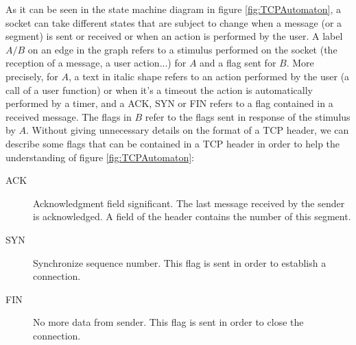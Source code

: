 \documentclass[a4paper, 10pt]{article}
\begin{document}
    As it can be seen in the state machine diagram in figure \ref{fig:TCPAutomaton},
    a socket can take different states that are
    subject to change when a message (or a segment) is sent or received or when an action
    is performed by the user. A label $A/B$ on an edge in the graph refers to a stimulus performed on the socket
    (the reception of a message, a user action...) for $A$ and a flag sent for $B$.
    More precisely, for $A$, a text in italic shape refers to an action performed by
    the user (a call of a user function) or when it's a timeout the action is automatically
    performed by a timer, and a ACK, SYN or FIN refers to a flag contained in a received message.
    The flags in $B$ refer to the flags sent in response of the stimulus by $A$.
    Without giving unnecessary details on the format of a TCP header, we can
    describe some flags that can be contained in a TCP header in order to help the understanding
    of figure \ref{fig:TCPAutomaton}:
    \begin{description}
        \item[ACK] Acknowledgment field significant. The last message received by the sender
        is acknowledged. A field of the header contains the number of this segment.
        \item[SYN] Synchronize sequence number. This flag is sent in order to establish
        a connection.
        \item[FIN] No more data from sender. This flag is sent in order to close the
        connection.
    \end{description}
    
\end{document}
